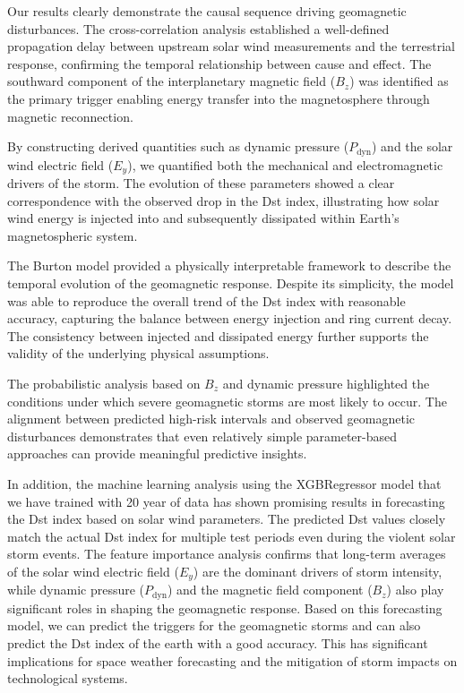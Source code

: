 \documentclass[12pt]{article}
\begin{document}
Our results clearly demonstrate the causal sequence driving geomagnetic disturbances. The cross-correlation analysis established a well-defined propagation delay between upstream solar wind measurements and the terrestrial response, confirming the temporal relationship between cause and effect. The southward component of the interplanetary magnetic field ($B_z$) was identified as the primary trigger enabling energy transfer into the magnetosphere through magnetic reconnection.

By constructing derived quantities such as dynamic pressure ($P_{\mathrm{dyn}}$) and the solar wind electric field ($E_y$), we quantified both the mechanical and electromagnetic drivers of the storm. The evolution of these parameters showed a clear correspondence with the observed drop in the Dst index, illustrating how solar wind energy is injected into and subsequently dissipated within Earth's magnetospheric system.

The Burton model provided a physically interpretable framework to describe the temporal evolution of the geomagnetic response. Despite its simplicity, the model was able to reproduce the overall trend of the Dst index with reasonable accuracy, capturing the balance between energy injection and ring current decay. The consistency between injected and dissipated energy further supports the validity of the underlying physical assumptions.

The probabilistic analysis based on $B_z$ and dynamic pressure highlighted the conditions under which severe geomagnetic storms are most likely to occur. The alignment between predicted high-risk intervals and observed geomagnetic disturbances demonstrates that even relatively simple parameter-based approaches can provide meaningful predictive insights.

In addition, the machine learning analysis using the XGBRegressor model that we have trained with 20 year of data has shown promising results in forecasting the Dst index based on solar wind parameters. The predicted Dst values closely match the actual Dst index for multiple test periods even during the violent solar storm events. The feature importance analysis confirms that long-term averages of the solar wind electric field ($E_y$) are the dominant drivers of storm intensity, while dynamic pressure ($P_{\mathrm{dyn}}$) and the magnetic field component ($B_z$) also play significant roles in shaping the geomagnetic response. Based on this forecasting model, we can predict the triggers for the geomagnetic storms and can also predict the Dst index of the earth with a good accuracy. This has significant implications for space weather forecasting and the mitigation of storm impacts on technological systems.
\end{document}
